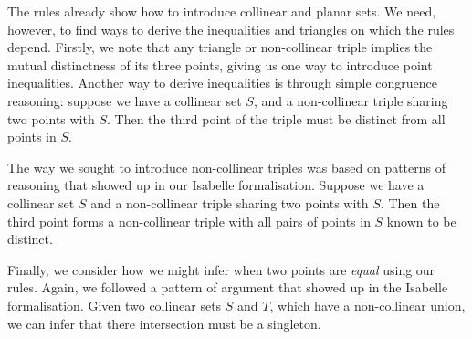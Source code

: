 The rules already show how to introduce collinear and planar sets. We need, however, to find ways to derive the inequalities and triangles on which the rules depend. Firstly, we note that any triangle or non-collinear triple implies the mutual distinctness of its three points, giving us one way to introduce point inequalities. Another way to derive inequalities is through simple congruence reasoning: suppose we have a collinear set $S$, and a non-collinear triple sharing two points with $S$. Then the third point of the triple must be distinct from all points in $S$. 

The way we sought to introduce non-collinear triples was based on patterns of reasoning that showed up in our Isabelle formalisation. Suppose we have a collinear set $S$ and a non-collinear triple sharing two points with $S$. Then the third point forms a non-collinear triple with all pairs of points in $S$ known to be distinct.

Finally, we consider how we might infer when two points are \emph{equal} using our rules. Again, we followed a pattern of argument that showed up in the Isabelle formalisation. Given two collinear sets $S$ and $T$, which have a non-collinear union, we can infer that there intersection must be a singleton.

